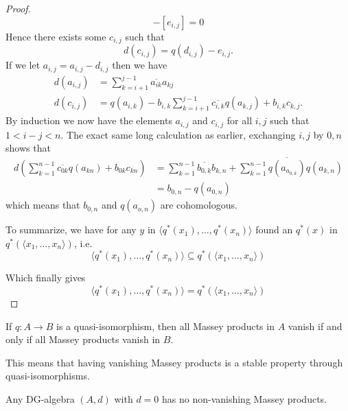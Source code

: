 \begin{proof}
\begin{equation*}
    [q(d_{i,j})]-[e_{i,j}] = 0
\end{equation*}
Hence there exists some $c_{i,j}$ such that 
\begin{equation*}
    d(c_{i,j}) = q(d_{i,j}) - e_{i,j}.
\end{equation*}
If we let $a_{i,j} = a_{i,j}-d_{i,j}$ then we have 
\begin{align*}
    d(a_{i,j}) &= \sum_{k=i+1}^{j-1}\overline{a_{ik}}a_{kj} 
    \\
    d(c_{i,j}) &= q(a_{i,k}) - b_{i,k} \sum_{k=i+1}^{j-1}\overline{c_{i,k}}q(a_{k,j}) + b_{i,k}c_{k,j}.
\end{align*}
By induction we now have the elements $a_{i,j}$ and $c_{i,j}$ for all $i,j$ such that $1<i-j<n$. The exact same long calculation as earlier, exchanging $i,j$ by $0,n$ shows that 
\begin{align*}
    d(\sum_{k=1}^{n-1}\overline{c_{0k}}q(a_{kn})+b_{0k}c_{kn})
    &=
    \sum_{k=1}^{n-1}\overline{b_{0,k}}b_{k,n} + \sum_{k=1}^{n-1}\overline{q(a_{a_{0,k}})}q(a_{k,n}) \\
    &= b_{0,n} - q(a_{0,n})
\end{align*}
which means that $b_{0,n}$ and $q(a_{o,n})$ are cohomologous. 

To summarize, we have for any $y$ in $ \langle q^*(x_1), \ldots, q^*(x_n)\rangle$ found an $q^*(x)$ in $q^*(\langle x_1, \ldots, x_n\rangle)$, i.e.
\begin{equation*}
    \langle q^*(x_1), \ldots, q^*(x_n)\rangle \subseteq q^*(\langle x_1, \ldots, x_n\rangle)
\end{equation*}

Which finally gives 
\begin{equation*}
    \langle q^*(x_1), \ldots, q^*(x_n)\rangle = q^*(\langle x_1, \ldots, x_n\rangle)
\end{equation*}
\end{proof}


\begin{corollary}
\label{cor:quasi_preserves_massey}
If $q\colon A\longrightarrow B$ is a quasi-isomorphism, then all Massey products in $A$ vanish if and only if all Massey products vanish in $B$. 
\end{corollary}


This means that having vanishing Massey products is a stable property through quasi-isomorphisms. 

\begin{lemma}
\label{lm:trivial_differential_then_no_massey}
Any DG-algebra $(A, d)$ with $d=0$ has no non-vanishing Massey products.
\end{lemma}

